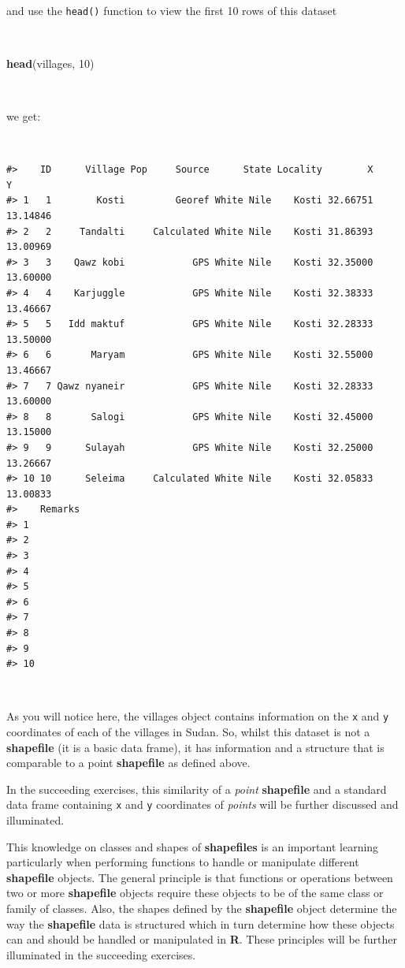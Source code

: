 \documentclass[12pt,a4paper,a4paper]{book}
\newenvironment{Shaded}{\begin{snugshade}}{\end{snugshade}}
\newcommand{\KeywordTok}[1]{\textcolor[rgb]{0.13,0.29,0.53}{\textbf{#1}}}
\newcommand{\DecValTok}[1]{\textcolor[rgb]{0.00,0.00,0.81}{#1}}
\newcommand{\NormalTok}[1]{#1}
\theoremstyle{definition}
\theoremstyle{definition}
\theoremstyle{definition}
\theoremstyle{remark}
\begin{document}
~

and use the \texttt{head()} function to view the first 10 rows of this
dataset

~

\begin{Shaded}
\begin{Highlighting}[]
\KeywordTok{head}\NormalTok{(villages, }\DecValTok{10}\NormalTok{)}
\end{Highlighting}
\end{Shaded}

~

we get:

~

\begin{verbatim}
#>    ID      Village Pop     Source      State Locality        X        Y
#> 1   1        Kosti         Georef White Nile    Kosti 32.66751 13.14846
#> 2   2     Tandalti     Calculated White Nile    Kosti 31.86393 13.00969
#> 3   3    Qawz kobi            GPS White Nile    Kosti 32.35000 13.60000
#> 4   4    Karjuggle            GPS White Nile    Kosti 32.38333 13.46667
#> 5   5   Idd maktuf            GPS White Nile    Kosti 32.28333 13.50000
#> 6   6       Maryam            GPS White Nile    Kosti 32.55000 13.46667
#> 7   7 Qawz nyaneir            GPS White Nile    Kosti 32.28333 13.60000
#> 8   8       Salogi            GPS White Nile    Kosti 32.45000 13.15000
#> 9   9      Sulayah            GPS White Nile    Kosti 32.25000 13.26667
#> 10 10      Seleima     Calculated White Nile    Kosti 32.05833 13.00833
#>    Remarks
#> 1         
#> 2         
#> 3         
#> 4         
#> 5         
#> 6         
#> 7         
#> 8         
#> 9         
#> 10
\end{verbatim}

~

As you will notice here, the villages object contains information on the
\texttt{x} and \texttt{y} coordinates of each of the villages in Sudan.
So, whilst this dataset is not a \textbf{shapefile} (it is a basic data
frame), it has information and a structure that is comparable to a point
\textbf{shapefile} as defined above.

In the succeeding exercises, this similarity of a \emph{point}
\textbf{shapefile} and a standard data frame containing \texttt{x} and
\texttt{y} coordinates of \emph{points} will be further discussed and
illuminated.

This knowledge on classes and shapes of \textbf{shapefiles} is an
important learning particularly when performing functions to handle or
manipulate different \textbf{shapefile} objects. The general principle
is that functions or operations between two or more \textbf{shapefile}
objects require these objects to be of the same class or family of
classes. Also, the shapes defined by the \textbf{shapefile} object
determine the way the \textbf{shapefile} data is structured which in
turn determine how these objects can and should be handled or
manipulated in \textbf{R}. These principles will be further illuminated
in the succeeding exercises.
\end{document}
